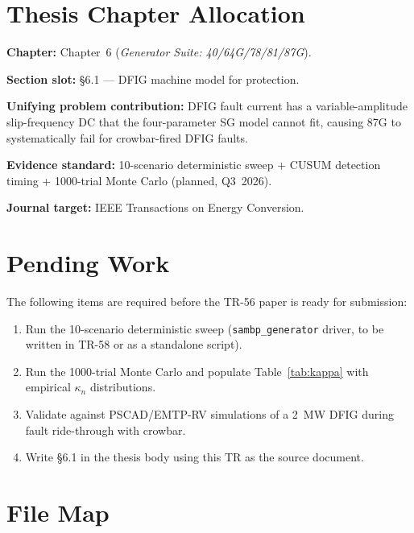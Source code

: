 \documentclass[11pt,a4paper]{article}
\begin{document}
\section{Thesis Chapter Allocation}
\label{sec:thesis}

\textbf{Chapter:} Chapter~6 (\textit{Generator Suite: 40/64G/78/81/87G}).

\textbf{Section slot:} \S6.1 — DFIG machine model for protection.

\textbf{Unifying problem contribution:} DFIG fault current has a
variable-amplitude slip-frequency DC that the four-parameter SG model cannot
fit, causing 87G to systematically fail for crowbar-fired DFIG faults.

\textbf{Evidence standard:} 10-scenario deterministic sweep + CUSUM detection
timing + 1000-trial Monte Carlo (planned, Q3~2026).

\textbf{Journal target:} IEEE Transactions on Energy Conversion.

\section{Pending Work}
\label{sec:pending}

The following items are required before the TR-56 paper is ready for
submission:

\begin{enumerate}
  \item Run the 10-scenario deterministic sweep
        (\texttt{sambp\_generator} driver, to be written in TR-58 or as a
        standalone script).
  \item Run the 1000-trial Monte Carlo and populate Table~\ref{tab:kappa}
        with empirical $\kappa_n$ distributions.
  \item Validate against PSCAD/EMTP-RV simulations of a 2~MW DFIG
        during fault ride-through with crowbar.
  \item Write \S6.1 in the thesis body using this TR as the source document.
\end{enumerate}

\appendix
\section{File Map}
\label{app:files}
\end{document}
